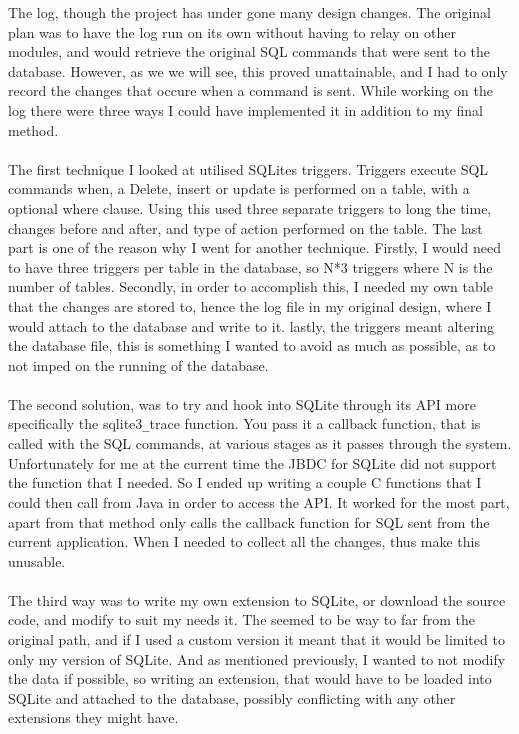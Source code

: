 The log, though the project has under gone many design changes. The original plan was to have the log run on its own without having to relay on other modules, and would retrieve the original SQL commands that were sent to the database. However, as we we will see, this proved unattainable, and I had to only record the changes that occure when a command is sent. While working on the log there were three ways I could have implemented it in addition to my final method.
\\\\
The first technique I looked at utilised SQLites triggers. Triggers execute SQL commands when, a Delete, insert or update is performed on a table, with a optional where clause. Using this \cite{sqlitetriggers} used three separate triggers to long the time, changes before and after, and type of action performed on the table. The last part is one of the reason why I went for another technique. Firstly, I would need to have three triggers per table in the database, so N*3 triggers where N is the number of tables. Secondly, in order to accomplish this, I needed my own table that the changes are stored to, hence the log file in my original design, where I would attach to the database and write to it. lastly, the triggers meant altering the database file, this is something I wanted to avoid as much as possible, as to not imped on the running of the database.  
\\\\
The second solution, was to try and hook into SQLite through its API more specifically the sqlite3\verb|_|trace function. You pass it a callback function, that is called with the SQL commands, at various stages as it passes through the system. Unfortunately for me at the current time the JBDC for SQLite did not support the function that I needed. So I ended up writing a couple C functions that I could then call from Java in order to access the API. It worked for the most part, apart from that method only calls the callback function for SQL sent from the current application. When I needed to collect all the changes, thus make this unusable. 
\\\\
The third way was to write my own extension to SQLite, or download the source code, and modify to suit my needs it. The seemed to be way to far from the original path, and if I used a custom version it meant that it would be limited to only my version of SQLite. And as mentioned previously, I wanted to not modify the data if possible, so writing an extension, that would have to be loaded into SQLite and attached to the database, possibly conflicting with any other extensions they might have.
